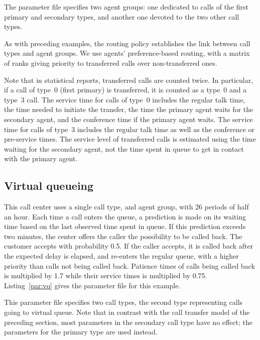 The parameter file specifies two agent groups: one dedicated to calls
of the first primary and secondary types, and another one devoted to
the two other call types.

As with preceding examples, the routing policy establishes the link
between call types and agent groups.  We use agents' preference-based
routing, with a matrix of ranks giving priority to transferred calls
over non-transferred ones.

Note that in statistical reports, transferred calls are counted twice.
In particular, if a call of type~0 (first primary) is transferred, it
is counted as a type~0 and a type~3 call.
The service time for calls of type~0 includes the regular talk time,
the time needed to initiate the transfer, the time the primary agent
waits for the secondary agent, and the conference time if the primary
agent waits.
The service time for calls of type~3 includes the regular talk time as
well as the conference or pre-service times.
The service level of transferred calls is estimated using the time
waiting for the secondary agent, not the time spent in queue to get in
contact with the primary agent.

\subsection{Virtual queueing}
\label{sec:virtualQueue}

This call center uses a single call type, and agent group, with 26
periods of half an hour.
Each time a call enters the queue, a prediction is made on its waiting
time based on the last observed time spent in queue.
If this prediction exceeds two minutes, the center offers the caller
the possibility to be called back.
The customer accepts with probability 0.5.
If the caller accepts, it is called back after the expected delay is
elapsed, and re-enters the regular queue, with a higher priority than
calls not being called back.
Patience times of calls being called back is multiplied by 1.7 while
their service times is multiplied by 0.75.
Listing~\ref{par:vq} gives the parameter file for this example.



This parameter file specifies two call types, the second type
representing calls going to virtual queue.
Note that in contrast with the call transfer model of the preceding
section, most parameters in the secondary call type have no effect;
the parameters for the primary type are used instead.

